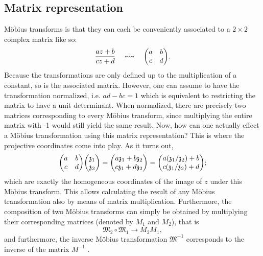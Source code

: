 \subsection{Matrix representation}
Möbius transforms is that they can each be conveniently associated to a \(2\times 2\) complex matrix like so:
\[ \frac{az + b}{cz + d} \corresponds \mqty(a & b \\ c & d).\] 
Because the transformations are only defined up to the multiplication of a constant, so is the associated matrix. However, one can assume to have the transformation normalized, i.e. \(ad - bc = 1\) which is equivalent to restricting the matrix to have a unit determinant.  When normalized, there are precisely two matrices corresponding to every Möbius transform, since multiplying the entire matrix with -1 would still yield the same result. Now, how can one actually effect a Möbius transformation using this matrix representation? This is where the projective coordinates come into play. As it turns out, 
\[ 
    \mqty(a & b\\ c & d)\mqty(\mathfrak{z}_1\\\mathfrak{z}_2)
    = \mqty(a\mathfrak{z}_1 + b\mathfrak{z}_2\\c\mathfrak{z}_1 + d\mathfrak{z}_2)
    =\mqty(a(\mathfrak{z}_1/\mathfrak{z}_2) + b\\c(\mathfrak{z}_1/\mathfrak{z}_2) + d);
\]
which are exactly the homogeneous coordinates of the image of \(z\) under this Möbius transform. This allows calculating the result of any Möbius transformation also by means of matrix multiplication. Furthermore, the composition of two Möbius transforms  can simply be obtained by multiplying their corresponding matrices (denoted by \(M_1\) and \(M_2\)), that is
\[\mathfrak{M}_2 \circ \mathfrak{M}_1 \to M_2 M_1,\]
and furthermore, the inverse Möbius transformation \(\mathfrak{M}^{-1}\) corresponds to the inverse of the matrix \(M^{-1}\) \cite{Needham2021}.


